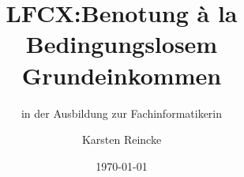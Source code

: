 \documentclass[]{beamer}
\title{LFCX:Benotung à la Bedingungslosem Grundeinkommen}
\subtitle{in der Ausbildung zur Fachinformatikerin}
\institute[GS-LDK]{Gewerbliche Schulen Dillenburg}
\author{Karsten Reincke}
\date{\today}
\def\cfgGl{../../../cfg.gl/}
\begin{document}

\begin{frame}
  \titlepage

  
\end{frame}






\logo{}
\newpage



%
\end{document}
